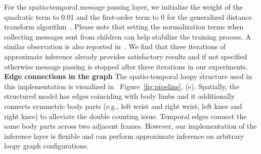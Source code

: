\documentclass[10pt,twocolumn,letterpaper]{article}
\newcommand{\figref}[1]{Figure~\ref{#1}}
\begin{document}
For the spatio-temporal message passing layer, we initialize the weight of the quadratic term to 0.01 and the first-order term to 0 for the generalized distance transform algorithm~\cite{felzenszwalb2004distance}. Please note that setting the normalization terms when collecting messages sent from children can help stabilize the training process. A similar observation is also reported in~\cite{yang2016end}. We find that three iterations of approximate inference already provides satisfactory results and if not specified otherwise message passing is stopped after three iterations in our experiments.\\

\noindent\textbf{Edge connections in the graph}
The spatio-temporal loopy structure used in this implementation is visualized in ~\figref{fig:pipeline}, (e). Spatially, the
structured model has edges coinciding with body limbs and it additionally connects symmetric body parts (e.g., left wrist and right wrist, left knee and right knee) to alleviate the double counting issue. Temporal edges connect the same body parts across two adjacent frames. However, our implementation of the inference layer is flexible and can perform approximate inference on arbitrary loopy graph configurations.
\end{document}
